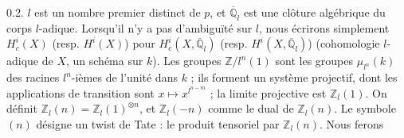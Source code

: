 \documentclass[9pt,twoside]{extarticle}
\begin{document}
{0.2. \(l\) est un nombre premier distinct de \(p\), et \(\overline{\mathbb{Q}}_l\) est une clôture algébrique du corps \(l\)-adique. Lorsqu'il n'y a pas d'ambiguïté sur \(l\), nous écrirons simplement \(H_c^i(X)\) (resp. \(H^i(X)\)) pour \(H_c^i(X,\overline{\mathbb{Q}}_l)\) (resp. \(H^i(X,\overline{\mathbb{Q}}_l)\)) (cohomologie \(l\)-adique de \(X\), un schéma sur \(k\)). Les groupes \(\mathbb{Z}/l^n(1)\) sont les groupes \(\mu_{l^n}(k)\) des racines \(l^n\)-ièmes de l'unité dans \(k\) ; ils forment un système projectif, dont les applications de transition sont \(x\mapsto x^{l^{n-m}}\) ; la limite projective est \(\mathbb{Z}_l(1)\). On définit \(\mathbb{Z}_l(n)=\mathbb{Z}_l(1)^{\otimes n}\), et \(\mathbb{Z}_l(-n)\) comme le dual de \(\mathbb{Z}_l(n)\). Le symbole \((n)\) désigne un twist de Tate : le produit tensoriel par \(\mathbb{Z}_l(n)\). Nous ferons\par
}
\end{document}
